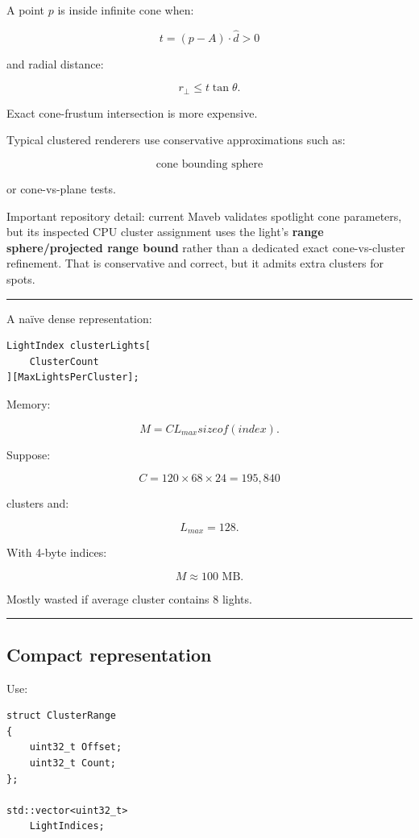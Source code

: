 A point \(p\) is inside infinite cone when:

\[
t=
(p-A)\cdot\hat d>0
\]

and radial distance:

\[
r_\perp
\le
t\tan\theta.
\]

Exact cone-frustum intersection is more expensive.

Typical clustered renderers use conservative approximations such as:

\[
\text{cone bounding sphere}
\]

or cone-vs-plane tests.

Important repository detail: current Maveb validates spotlight cone parameters, but its inspected CPU cluster assignment uses the light's \textbf{range sphere/projected range bound} rather than a dedicated exact cone-vs-cluster refinement. That is conservative and correct, but it admits extra clusters for spots.

\begin{center}\rule{0.5\linewidth}{0.5pt}\end{center}

A naïve dense representation:

\begin{verbatim}
LightIndex clusterLights[
    ClusterCount
][MaxLightsPerCluster];
\end{verbatim}

Memory:

\[
M=
C
L_{max}
sizeof(index).
\]

Suppose:

\[
C=120\times68\times24
=
195,840
\]

clusters and:

\[
L_{max}=128.
\]

With 4-byte indices:

\[
M\approx100\text{ MB}.
\]

Mostly wasted if average cluster contains 8 lights.

\begin{center}\rule{0.5\linewidth}{0.5pt}\end{center}

\subsection{Compact representation}\label{04-visual-computing-ii-ch040-compact-representation}

Use:

\begin{verbatim}
struct ClusterRange
{
    uint32_t Offset;
    uint32_t Count;
};

std::vector<uint32_t>
    LightIndices;
\end{verbatim}

